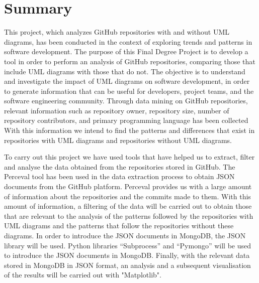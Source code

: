 \documentclass[a4paper, 12pt]{book}
\begin{document}



\chapter*{Summary}

This project, which analyzes GitHub repositories with and without UML diagrams, has been conducted in the context of exploring trends and patterns in software development.
The purpose of this Final Degree Project is to develop a tool in order to perform an analysis of GitHub repositories, comparing those that include UML diagrams with those that do not.
The objective is to understand and investigate the impact of UML diagrams on software development, in order to generate information that can be useful for developers, project teams, and the software engineering community.
Through data mining on GitHub repositories, relevant information such as repository owner, repository size, number of repository contributors, and primary programming language has been collected
With this information we intend to find the patterns and differences that exist in repositories with UML diagrams and repositories without UML diagrams.


To carry out this project we have used tools that have helped us to extract, filter and analyse the data obtained from the repositories stored in GitHub.
The Perceval tool has been used in the data extraction process to obtain JSON documents from the GitHub platform. 
Perceval provides us with a large amount of information about the repositories and the commits made to them.
With this amount of information, a filtering of the data will be carried out to obtain those that are relevant to the analysis of the patterns followed by the repositories with UML diagrams and the patterns that follow the repositories without these diagrams.
In order to introduce the JSON documents in MongoDB, the JSON library will be used.
Python libraries ``Subprocess'' and ``Pymongo'' will be used to introduce the JSON documents in MongoDB. Finally, with the relevant data stored in MongoDB in JSON format, an analysis and a subsequent visualisation of the results will be carried out with "Matplotlib".
\end{document}
